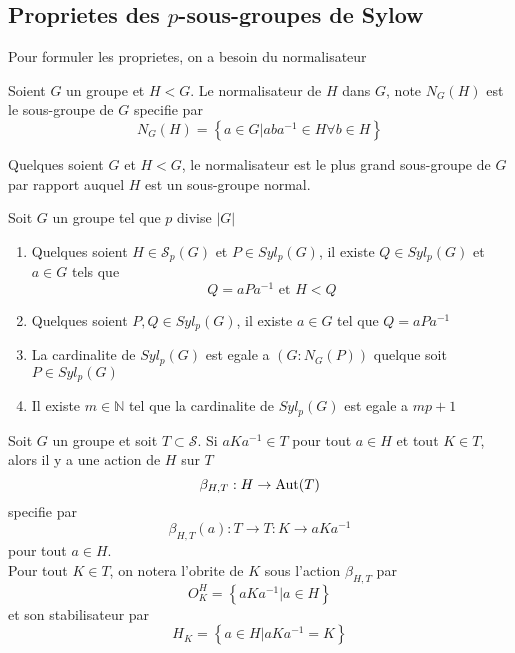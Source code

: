 \documentclass[../main.tex]{subfiles}
\begin{document}
\subsection{Proprietes des $p$-sous-groupes de Sylow}
Pour formuler les proprietes, on a besoin du normalisateur
\begin{defn}[Normalisateur]
	Soient $G$ un groupe et $H < G$. Le normalisateur de $H$ dans $G$, note $N_G( H) $ est le sous-groupe de $G$ specifie par
	\[ 
	N_G( H) = \left\{ a \in G | aba^{-1}\in H \forall b \in H \right\} 
	\]
	
\end{defn}
\begin{rmq}
Quelques soient $G$ et $H< G$, le normalisateur est le plus grand sous-groupe de $G$ par rapport auquel $H$ est un sous-groupe normal.
\end{rmq}
\begin{thm}
	Soit $G$ un groupe tel que $p$ divise $|G|$ 
	\begin{enumerate}
	\item Quelques soient $H \in \mathcal{S}_p( G) $ et $P \in Syl_p( G)$, il existe $Q \in Syl_p( G) $ et $a \in G$ tels que 
		\[ 
		Q = aPa^{-1} \text{ et  } H<Q
		\]
		
	\item Quelques soient $P,Q\in Syl_p( G) $, il existe $a\in G$ tel que $Q = a Pa^{-1}$ 
	\item La cardinalite de $Syl_p( G) $ est egale a $( G:N_G( P) ) $ quelque soit $P \in Syl_p( G) $ 
	\item Il existe $m \in \mathbb{N}$ tel que la cardinalite de $Syl_p( G) $ est egale a $mp+1$ 
	\end{enumerate}
	
\end{thm}
\begin{rmq}
Soit $G$ un groupe et soit $ T \subset \mathcal{S}$. Si $aK a^{-1}\in T$ pour tout $a\in H$ et tout $K \in T$, alors il y a une action de $H$ sur $T$ 
\[ 
\beta_{H, T} : H \to \operatorname{Aut}( T) 
\]
specifie par 
\[ 
\beta_{H,T} ( a) : T \to T: K \to aKa^{-1}
\]
pour tout $a \in H$.\\
Pour tout $K \in T$, on notera l'obrite de $K$ sous l'action $\beta_{H,T} $ par 
\[ 
O_K^{H}= \left\{ aKa^{-1}| a \in H \right\} 
\]
et son stabilisateur par
\[ 
	H_K = \left\{ a \in H | aKa^{-1}= K \right\} 
\]

\end{rmq}
\end{document}
